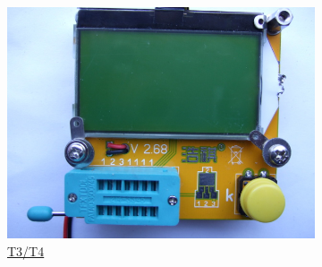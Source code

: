 \documentclass[pdftex,12pt,a4paper,english]{article}
\begin{document}
\begin{figure}[H]
\begin{subfigure}[b]{.3\textwidth}
    \includegraphics[width=1.\textwidth]{../PNG/T3_Front.JPG}
	  {\href{run:./trunk/mega328_T3_T4_st7565/.}{T3/T4}}
  \end{subfigure}
\end{figure}
\end{document}
